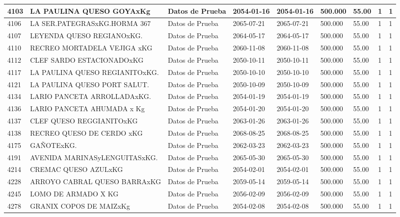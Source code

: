 \documentclass[a4paper,12pt]{article}
\begin{document}
\begin{landscape}
\begin{longtable}{|p{4cm}|p{2.5cm}|p{2.5cm}|p{1.8cm}|p{1.8cm}|p{1cm}|p{1cm}|p{3cm}|p{3cm}||}
4103 & LA PAULINA QUESO GOYAxKg & Datos de Prueba & 2054-01-16 & 2054-01-16 & 500.000 & 55.00 & 1 & 1 \\ \hline 
4106 & LA SER.PATEGRASxKG.HORMA   367 & Datos de Prueba & 2065-07-21 & 2065-07-21 & 500.000 & 55.00 & 1 & 1 \\ \hline 
4107 & LEYENDA QUESO REGIANOxKG. & Datos de Prueba & 2064-05-17 & 2064-05-17 & 500.000 & 55.00 & 1 & 1 \\ \hline 
4110 & RECREO MORTADELA VEJIGA xKG & Datos de Prueba & 2060-11-08 & 2060-11-08 & 500.000 & 55.00 & 1 & 1 \\ \hline 
4112 & CLEF SARDO ESTACIONADOxKG & Datos de Prueba & 2050-10-11 & 2050-10-11 & 500.000 & 55.00 & 1 & 1 \\ \hline 
4117 & LA PAULINA QUESO REGIANITOxKG. & Datos de Prueba & 2050-10-10 & 2050-10-10 & 500.000 & 55.00 & 1 & 1 \\ \hline 
4121 & LA PAULINA QUESO PORT SALUT. & Datos de Prueba & 2050-10-09 & 2050-10-09 & 500.000 & 55.00 & 1 & 1 \\ \hline 
4134 & LARIO PANCETA ARROLLADAxKG. & Datos de Prueba & 2054-01-19 & 2054-01-19 & 500.000 & 55.00 & 1 & 1 \\ \hline 
4136 & LARIO PANCETA AHUMADA x Kg & Datos de Prueba & 2054-01-20 & 2054-01-20 & 500.000 & 55.00 & 1 & 1 \\ \hline 
4137 & CLEF QUESO REGGIANITOxKG & Datos de Prueba & 2063-01-26 & 2063-01-26 & 500.000 & 55.00 & 1 & 1 \\ \hline 
4138 & RECREO QUESO DE CERDO xKG & Datos de Prueba & 2068-08-25 & 2068-08-25 & 500.000 & 55.00 & 1 & 1 \\ \hline 
4175 & GAÑOTExKG. & Datos de Prueba & 2062-03-23 & 2062-03-23 & 500.000 & 55.00 & 1 & 1 \\ \hline 
4191 & AVENIDA MARINASyLENGUITASxKG. & Datos de Prueba & 2065-05-30 & 2065-05-30 & 500.000 & 55.00 & 1 & 1 \\ \hline 
4214 & CREMAC QUESO AZULxKG & Datos de Prueba & 2054-02-01 & 2054-02-01 & 500.000 & 55.00 & 1 & 1 \\ \hline 
4228 & ARROYO CABRAL QUESO BARRAxKG & Datos de Prueba & 2059-05-14 & 2059-05-14 & 500.000 & 55.00 & 1 & 1 \\ \hline 
4245 & LOMO DE ARMADO X KG & Datos de Prueba & 2056-02-09 & 2056-02-09 & 500.000 & 55.00 & 1 & 1 \\ \hline 
4278 & GRANIX COPOS DE MAIZxKg & Datos de Prueba & 2054-02-08 & 2054-02-08 & 500.000 & 55.00 & 1 & 1 \\ \hline 

\end{longtable}
\end{landscape}
\end{document}
